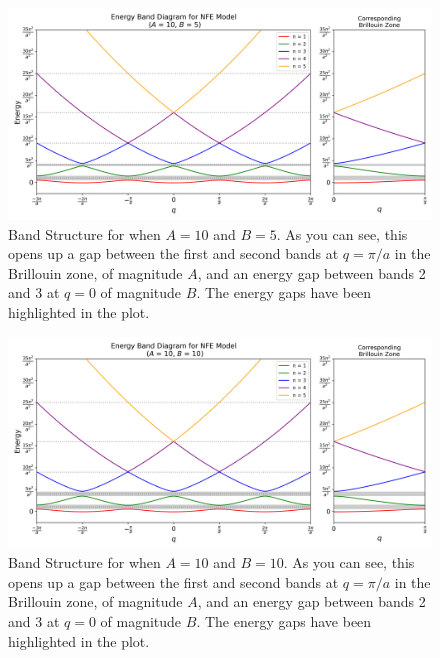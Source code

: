 \documentclass[12pt,a4paper]{article}
\begin{document}
\begin{figure}[H]
    \centering
    \includegraphics[width=1\linewidth]{images/3.png}
    \caption{Band Structure for when $A=10$ and $B=5$. As you can see, this opens up a gap between the first and second bands at $q=\pi/a$ in the Brillouin zone, of magnitude $A$, and an energy gap between bands 2 and 3 at $q=0$ of magnitude $B$. The energy gaps have been highlighted in the plot.}
    \label{3}
\end{figure}

\begin{figure}[H]
    \centering
    \includegraphics[width=1\linewidth]{images/4.png}
    \caption{Band Structure for when $A=10$ and $B=10$. As you can see, this opens up a gap between the first and second bands at $q=\pi/a$ in the Brillouin zone, of magnitude $A$, and an energy gap between bands 2 and 3 at $q=0$ of magnitude $B$. The energy gaps have been highlighted in the plot.}
    \label{4}
\end{figure}
\end{document}
